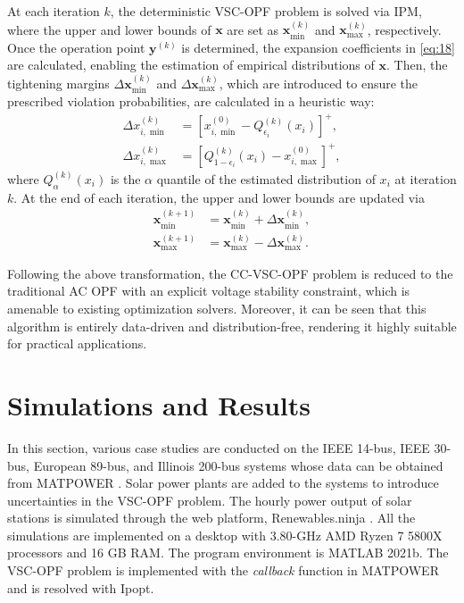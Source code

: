 \documentclass[journal]{IEEEtran}
\theoremstyle{definition}
\theoremstyle{remark}
\begin{document}
At each iteration $k$, the deterministic VSC-OPF problem is solved via IPM, where the upper and lower bounds of $\boldsymbol{x}$ are set as $\boldsymbol{x}_{\min}^{(k)}$ and $\boldsymbol{x}_{\max}^{(k)}$, respectively. Once the operation point $\boldsymbol{y}^{(k)}$ is determined, the expansion coefficients in \eqref{eq:18} are calculated, enabling the estimation of empirical distributions of $\boldsymbol{x}$. 
Then, the tightening margins $\Delta\boldsymbol{x}_{\min}^{(k)}$ and $\Delta\boldsymbol{x}_{\max}^{(k)}$, which are introduced to ensure the prescribed violation probabilities, are calculated in a heuristic way:  
\begin{subequations}\label{eq:26}
    \begin{align}
        \Delta x_{i,\min}^{(k)}&=\left[x_{i,\min}^{(0)}-Q_{\epsilon_i}^{(k)}\left(x_i\right)\right]^+,\\
        \Delta x_{i,\max}^{(k)}&=\left[Q_{1-\epsilon_i}^{(k)}\left(x_i\right)-x_{i,\max}^{(0)}\right]^+,
    \end{align}
\end{subequations}
where $Q_{\alpha}^{(k)}(x_i)$ is the $\alpha$ quantile of the estimated distribution of $x_i$ at iteration $k$.
At the end of each iteration, the upper and lower bounds are updated via
\begin{subequations}\label{eq:27}
    \begin{align}
        \boldsymbol{x}_{\min}^{(k+1)}&=\boldsymbol{x}_{\min}^{(k)}+\Delta\boldsymbol{x}_{\min}^{(k)},\\
        \boldsymbol{x}_{\max}^{(k+1)}&=\boldsymbol{x}_{\max}^{(k)}-\Delta\boldsymbol{x}_{\max}^{(k)}.
    \end{align}
\end{subequations}

Following the above transformation, the CC-VSC-OPF problem is reduced to the traditional AC OPF with an explicit voltage stability constraint, which is amenable to existing optimization solvers.
Moreover, it can be seen that this algorithm is entirely data-driven and distribution-free, rendering it highly suitable for practical applications.
\section{Simulations and Results}\label{simulation}
In this section, various case studies are conducted on the IEEE 14-bus, IEEE 30-bus, European 89-bus, and Illinois 200-bus systems whose data can be obtained from MATPOWER \cite{zimmer2011matpower}. Solar power plants are added to the systems to introduce uncertainties in the VSC-OPF problem. The hourly power output of solar stations is simulated through the web platform, Renewables.ninja \cite{pfenninger2016long}. 
All the simulations are implemented on a desktop with 3.80-GHz AMD Ryzen 7 5800X processors and 16 GB RAM. The program environment is MATLAB 2021b. The VSC-OPF problem is implemented with the \textit{callback} function in MATPOWER and is resolved with Ipopt.
\vspace{-10pt}
\end{document}
